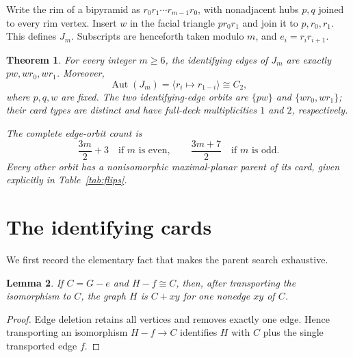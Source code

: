 \documentclass[11pt]{article}
\newtheorem{theorem}{Theorem}
\newtheorem{lemma}[theorem]{Lemma}
\newcommand{\Aut}{\operatorname{Aut}}
\begin{document}
Write the rim of a bipyramid as
$r_0r_1\cdots r_{m-1}r_0$, with nonadjacent hubs $p,q$ joined to every
rim vertex.  Insert $w$ in the facial triangle $pr_0r_1$ and join it to
$p,r_0,r_1$.  This defines $J_m$.  Subscripts are henceforth taken modulo
$m$, and $e_i=r_ir_{i+1}$.

\begin{theorem}\label{thm:main}
For every integer $m\geq6$, the identifying edges of $J_m$ are exactly
$pw,wr_0,wr_1$.  Moreover,
\[
 \Aut(J_m)=\langle r_i\mapsto r_{1-i}\rangle\cong C_2,
\]
where $p,q,w$ are fixed.  The two identifying-edge orbits are
$\{pw\}$ and $\{wr_0,wr_1\}$; their card types are distinct and have
full-deck multiplicities $1$ and $2$, respectively.

The complete edge-orbit count is
\[
 \frac{3m}{2}+3\quad\text{if $m$ is even},
 \qquad
 \frac{3m+7}{2}\quad\text{if $m$ is odd}.
\]
Every other orbit has a nonisomorphic maximal-planar parent of its card,
given explicitly in Table~\ref{tab:flips}.
\end{theorem}

\section{The identifying cards}

We first record the elementary fact that makes the parent search
exhaustive.

\begin{lemma}\label{lem:parent}
If $C=G-e$ and $H-f\cong C$, then, after transporting the isomorphism to
$C$, the graph $H$ is $C+xy$ for one nonedge $xy$ of $C$.
\end{lemma}

\begin{proof}
Edge deletion retains all vertices and removes exactly one edge.  Hence
transporting an isomorphism $H-f\to C$ identifies $H$ with $C$ plus the
single transported edge $f$.
\end{proof}
\end{document}
